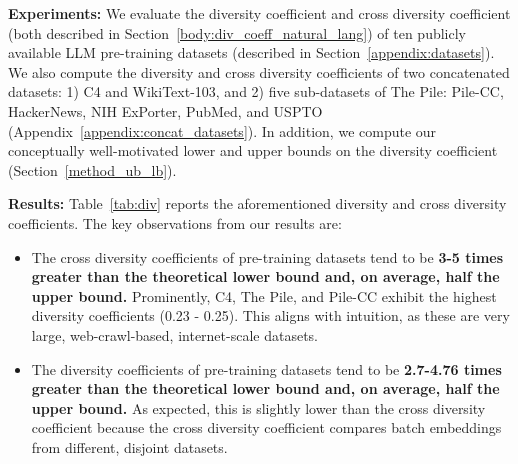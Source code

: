 \textbf{Experiments:} 
We evaluate the diversity coefficient and cross diversity coefficient (both described in Section~\ref{body:div_coeff_natural_lang}) of ten publicly available LLM pre-training datasets (described in Section~\ref{appendix:datasets}).
We also compute the diversity and cross diversity coefficients of two concatenated datasets: 
1) C4 and WikiText-103, and 
2) five sub-datasets of The Pile: Pile-CC, HackerNews, NIH ExPorter, PubMed, and USPTO (Appendix~\ref{appendix:concat_datasets}).
In addition, we compute our conceptually well-motivated lower and upper bounds on the diversity coefficient (Section~\ref{method_ub_lb}).

\textbf{Results:}
Table~\ref{tab:div} reports the aforementioned diversity and cross diversity coefficients. 
The key observations from our results are:
\begin{itemize}
    \item The cross diversity coefficients of pre-training datasets tend to be \textbf{3-5 times greater than the theoretical lower bound and, on average, half the upper bound.} 
    Prominently, C4, The Pile, and Pile-CC exhibit the highest diversity coefficients (0.23 - 0.25). This aligns with intuition, as these are very large, web-crawl-based, internet-scale datasets. 
    \item The diversity coefficients of pre-training datasets tend to be \textbf{2.7-4.76 times greater than the theoretical lower bound and, on average, half the upper bound.}
    As expected, this is slightly lower than the cross diversity coefficient because the cross diversity coefficient compares batch embeddings from different, disjoint datasets.
\end{itemize}


